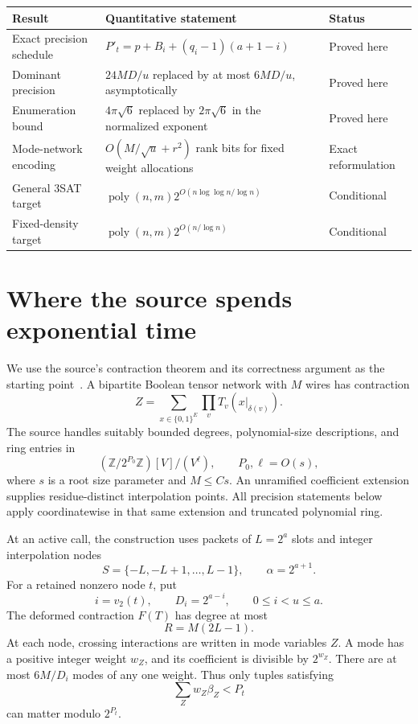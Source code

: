 \documentclass[11pt,letterpaper]{article}
\numberwithin{equation}{section}
\theoremstyle{definition}
\theoremstyle{remark}
\newcommand{\poly}{\operatorname{poly}}
\newcommand{\bits}{\{0,1\}}
\newcommand{\vTwo}{v_2}
\begin{document}
\begin{center}
\small
\begin{tabular}{@{}p{.25\linewidth}p{.43\linewidth}p{.22\linewidth}@{}}
\toprule
Result & Quantitative statement & Status \\
\midrule
Exact precision schedule & $P'_t=p+B_i+(q_i-1)(a+1-i)$ & Proved here \\
Dominant precision & $24MD/u$ replaced by at most $6MD/u$, asymptotically & Proved here \\
Enumeration bound & $4\pi\sqrt6$ replaced by $2\pi\sqrt6$ in the normalized exponent & Proved here \\
Mode-network encoding & $O(M/\sqrt u+r^2)$ rank bits for fixed weight allocations & Exact reformulation \\
General 3SAT target & $\poly(n,m)2^{O(n\log\log n/\log n)}$ & Conditional \\
Fixed-density target & $\poly(n,m)2^{O(n/\log n)}$ & Conditional \\
\bottomrule
\end{tabular}
\end{center}

\section{Where the source spends exponential time}
\label{sec:bottleneck}

We use the source's contraction theorem and its correctness argument as
the starting point~\cite{contraction,reduction}. A bipartite Boolean tensor
network with $M$ wires has contraction
\[
 Z=\sum_{x\in\bits^{E}}\prod_v T_v(x|_{\delta(v)}).
\]
The source handles suitably bounded degrees, polynomial-size descriptions,
and ring entries in
\[
 (\mathbb Z/2^{P_0}\mathbb Z)[V]/(V^\ell),
 \qquad P_0,\ell=O(s),
\]
where $s$ is a root size parameter and $M\le Cs$.
An unramified coefficient extension supplies residue-distinct interpolation
points. All precision statements below apply coordinatewise in that same
extension and truncated polynomial ring.

At an active call, the construction uses packets of $L=2^a$ slots and
integer interpolation nodes
\[
 S=\{-L,-L+1,\ldots,L-1\},\qquad \alpha=2^{a+1}.
\]
For a retained nonzero node $t$, put
\[
 i=\vTwo(t),\qquad D_i=2^{a-i},\qquad 0\le i<u\le a.
\]
The deformed contraction $F(T)$ has degree at most
\begin{equation}
 R=M(2L-1).\label{eq:degree}
\end{equation}
At each node, crossing interactions are written in mode variables $Z$.
A mode has a positive integer weight $w_Z$, and its coefficient is divisible
by $2^{w_Z}$. There are at most $6M/D_i$ modes of any one weight. Thus only
tuples satisfying
\begin{equation}
 \sum_Zw_Z\beta_Z<P_t\label{eq:budget}
\end{equation}
can matter modulo $2^{P_t}$.
\end{document}
